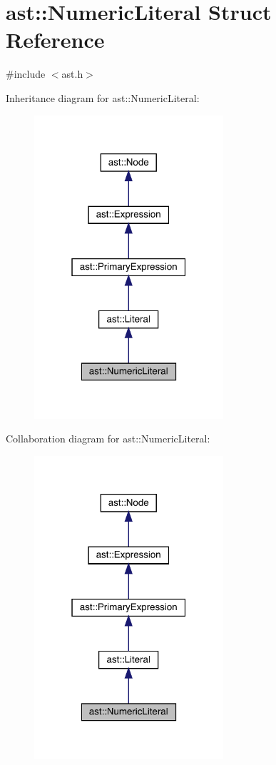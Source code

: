 \hypertarget{structast_1_1_numeric_literal}{}\section{ast\+:\+:Numeric\+Literal Struct Reference}
\label{structast_1_1_numeric_literal}


{\ttfamily \#include $<$ast.\+h$>$}



Inheritance diagram for ast\+:\+:Numeric\+Literal\+:\nopagebreak
\begin{figure}[H]
\begin{center}
\leavevmode
\includegraphics[width=199pt]{structast_1_1_numeric_literal__inherit__graph}
\end{center}
\end{figure}


Collaboration diagram for ast\+:\+:Numeric\+Literal\+:\nopagebreak
\begin{figure}[H]
\begin{center}
\leavevmode
\includegraphics[width=199pt]{structast_1_1_numeric_literal__coll__graph}
\end{center}
\end{figure}
